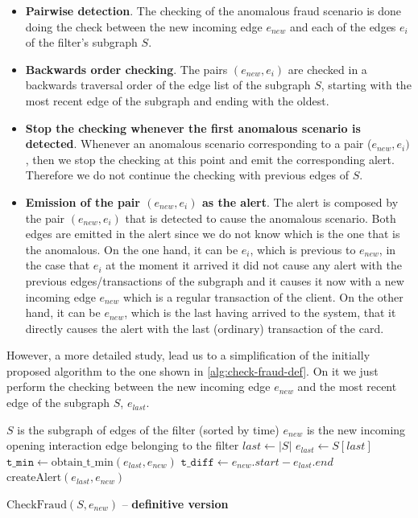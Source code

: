 \begin{itemize}
    \item \textbf{Pairwise detection}. The checking of the anomalous fraud scenario is done doing the check between the new incoming edge $e_{new}$ and each of the edges $e_i$ of the filter's subgraph $S$.
    \item \textbf{Backwards order checking}. The pairs $(e_{new}, e_i)$ are checked in a backwards traversal order of the edge list of the subgraph $S$, starting with the most recent edge of the subgraph and ending with the oldest.  
    \item \textbf{Stop the checking whenever the first anomalous scenario is detected}. Whenever an anomalous scenario corresponding to a pair ($e_{new}, e_i)$, then we stop the checking at this point and emit the corresponding alert. Therefore we do not continue the checking with previous edges of $S$. 
    \item \textbf{Emission of the pair $(e_{new}, e_i)$ as the alert}. The alert is composed by the pair $(e_{new}, e_i)$ that is detected to cause the anomalous scenario. Both edges are emitted in the alert since we do not know which is the one that is the anomalous. On the one hand, it can be $e_i$, which is previous to $e_{new}$, in the case that $e_i$ at the moment it arrived it did not cause any alert with the previous edges/transactions of the subgraph and it causes it now with a new incoming edge $e_{new}$ which is a regular transaction of the client. On the other hand, it can be $e_{new}$, which is the last having arrived to the system, that it directly causes the alert with the last (ordinary) transaction of the card.
\end{itemize}

However, a more detailed study, lead us to a simplification of the initially proposed algorithm to the one shown in \ref{alg:check-fraud-def}. On it we just perform the checking between the new incoming edge $e_{new}$ and the most recent edge of the subgraph $S$, $e_{last}$.

\begin{algorithm}[H]
  \small
  \begin{algorithmic}[1]
  \REQUIRE $S$ is the subgraph of edges of the filter (sorted by time)
  \REQUIRE $e_{new}$ is the new incoming opening interaction edge belonging to the filter 
  \STATE $last \gets |S|$
  \STATE $e_{last} \gets S[last]$
  \STATE $\texttt{t\_min} \gets \text{obtain\_t\_min}(e_{last}, e_{new})$
  \STATE $\texttt{t\_diff} \gets e_{new}.start - e_{last}.end$
    \STATE $\text{createAlert}(e_{last}, e_{new})$
  \ENDIF
  \end{algorithmic}
  \caption{$\text{CheckFraud}(S, e_{new})$ -- \textbf{definitive version}}
  \label{alg:check-fraud-def}
\end{algorithm}


